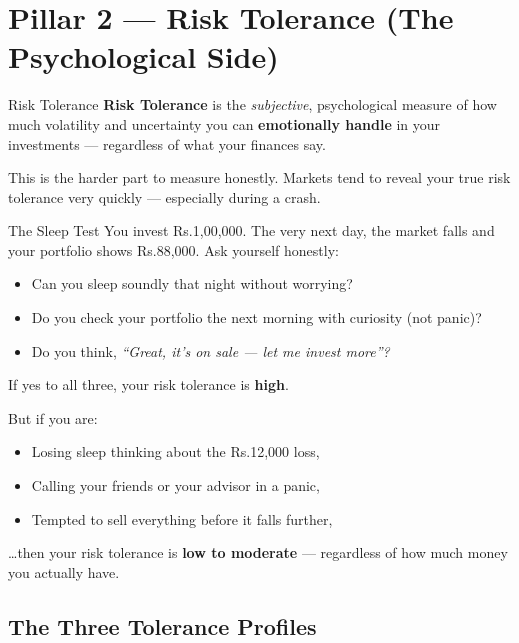 \documentclass[12pt,a4paper]{article}
\makeatletter
\newcommand{\rupee}{Rs.\@}
\makeatother
\begin{document}
\vspace{3mm}

\section{Pillar 2 --- Risk Tolerance (The Psychological Side)}

\begin{definitionbox}{Risk Tolerance}
\textbf{Risk Tolerance} is the \textit{subjective}, psychological measure of how much volatility and uncertainty you can \textbf{emotionally handle} in your investments --- regardless of what your finances say.
\end{definitionbox}

This is the harder part to measure honestly. Markets tend to reveal your true risk tolerance very quickly --- especially during a crash.

\begin{examplebox}{The Sleep Test}
You invest \rupee{}1,00,000. The very next day, the market falls and your portfolio shows \rupee{}88,000. Ask yourself honestly:
\begin{itemize}
  \item Can you sleep soundly that night without worrying?
  \item Do you check your portfolio the next morning with curiosity (not panic)?
  \item Do you think, \textit{``Great, it's on sale --- let me invest more''?}
\end{itemize}
If yes to all three, your risk tolerance is \textbf{high}.

\medskip
But if you are:
\begin{itemize}
  \item Losing sleep thinking about the \rupee{}12,000 loss,
  \item Calling your friends or your advisor in a panic,
  \item Tempted to sell everything before it falls further,
\end{itemize}
\ldots then your risk tolerance is \textbf{low to moderate} --- regardless of how much money you actually have.
\end{examplebox}

\vspace{2mm}

\subsection{The Three Tolerance Profiles}
\end{document}
